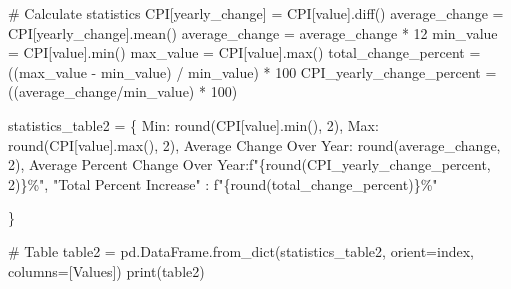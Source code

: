 \documentclass[
  letterpaper,
  DIV=11,
  numbers=noendperiod]{scrartcl}
\newenvironment{Shaded}{\begin{snugshade}}{\end{snugshade}}
\newcommand{\BuiltInTok}[1]{\textcolor[rgb]{0.00,0.23,0.31}{#1}}
\newcommand{\CommentTok}[1]{\textcolor[rgb]{0.37,0.37,0.37}{#1}}
\newcommand{\DecValTok}[1]{\textcolor[rgb]{0.68,0.00,0.00}{#1}}
\newcommand{\NormalTok}[1]{\textcolor[rgb]{0.00,0.23,0.31}{#1}}
\newcommand{\OperatorTok}[1]{\textcolor[rgb]{0.37,0.37,0.37}{#1}}
\newcommand{\SpecialCharTok}[1]{\textcolor[rgb]{0.37,0.37,0.37}{#1}}
\newcommand{\SpecialStringTok}[1]{\textcolor[rgb]{0.13,0.47,0.30}{#1}}
\newcommand{\StringTok}[1]{\textcolor[rgb]{0.13,0.47,0.30}{#1}}
\begin{document}
\begin{Shaded}
\begin{Highlighting}[]
\CommentTok{\# Calculate statistics}
\NormalTok{CPI[}\StringTok{\textquotesingle{}yearly\_change\textquotesingle{}}\NormalTok{] }\OperatorTok{=}\NormalTok{ CPI[}\StringTok{\textquotesingle{}value\textquotesingle{}}\NormalTok{].diff() }
\NormalTok{average\_change }\OperatorTok{=}\NormalTok{ CPI[}\StringTok{\textquotesingle{}yearly\_change\textquotesingle{}}\NormalTok{].mean() }
\NormalTok{average\_change }\OperatorTok{=}\NormalTok{ average\_change }\OperatorTok{*} \DecValTok{12}
\NormalTok{min\_value }\OperatorTok{=}\NormalTok{ CPI[}\StringTok{\textquotesingle{}value\textquotesingle{}}\NormalTok{].}\BuiltInTok{min}\NormalTok{()}
\NormalTok{max\_value }\OperatorTok{=}\NormalTok{ CPI[}\StringTok{\textquotesingle{}value\textquotesingle{}}\NormalTok{].}\BuiltInTok{max}\NormalTok{()}
\NormalTok{total\_change\_percent }\OperatorTok{=}\NormalTok{ ((max\_value }\OperatorTok{{-}}\NormalTok{ min\_value) }\OperatorTok{/}\NormalTok{ min\_value) }\OperatorTok{*} \DecValTok{100}
\NormalTok{CPI\_yearly\_change\_percent }\OperatorTok{=}\NormalTok{ ((average\_change}\OperatorTok{/}\NormalTok{min\_value) }\OperatorTok{*} \DecValTok{100}\NormalTok{)}


\NormalTok{statistics\_table2 }\OperatorTok{=}\NormalTok{ \{}
    \StringTok{\textquotesingle{}Min\textquotesingle{}}\NormalTok{: }\BuiltInTok{round}\NormalTok{(CPI[}\StringTok{\textquotesingle{}value\textquotesingle{}}\NormalTok{].}\BuiltInTok{min}\NormalTok{(), }\DecValTok{2}\NormalTok{),}
    \StringTok{\textquotesingle{}Max\textquotesingle{}}\NormalTok{: }\BuiltInTok{round}\NormalTok{(CPI[}\StringTok{\textquotesingle{}value\textquotesingle{}}\NormalTok{].}\BuiltInTok{max}\NormalTok{(), }\DecValTok{2}\NormalTok{),}
    \StringTok{\textquotesingle{}Average Change Over Year\textquotesingle{}}\NormalTok{: }\BuiltInTok{round}\NormalTok{(average\_change, }\DecValTok{2}\NormalTok{),}
    \StringTok{\textquotesingle{}Average Percent Change Over Year\textquotesingle{}}\NormalTok{:}\SpecialStringTok{f"}\SpecialCharTok{\{}\BuiltInTok{round}\NormalTok{(CPI\_yearly\_change\_percent, }\DecValTok{2}\NormalTok{)}\SpecialCharTok{\}}\SpecialStringTok{\%"}\NormalTok{,}
    \StringTok{"Total Percent Increase"}\NormalTok{ : }\SpecialStringTok{f"}\SpecialCharTok{\{}\BuiltInTok{round}\NormalTok{(total\_change\_percent)}\SpecialCharTok{\}}\SpecialStringTok{\%"}

\NormalTok{\}}

\CommentTok{\# Table}
\NormalTok{table2 }\OperatorTok{=}\NormalTok{ pd.DataFrame.from\_dict(statistics\_table2, orient}\OperatorTok{=}\StringTok{\textquotesingle{}index\textquotesingle{}}\NormalTok{, columns}\OperatorTok{=}\NormalTok{[}\StringTok{\textquotesingle{}Values\textquotesingle{}}\NormalTok{])}
\BuiltInTok{print}\NormalTok{(table2)}
\end{Highlighting}
\end{Shaded}
\end{document}
